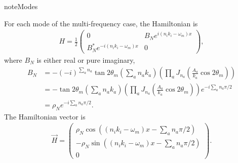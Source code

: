 \documentclass[letterpaper,12pt,english]{sphinxmanual}
\begin{document}
\begin{sphinxadmonition}{note}{Modes}

For each mode of the multi-frequency case, the Hamiltonian is
\begin{equation*}
\begin{split}H = \frac{1}{2}\begin{pmatrix}
0 & B_N e^{i(n_i k_i -\omega_m)x} \\
B_N^* e^{-i(n_i k_i -\omega_m)x} & 0
\end{pmatrix},\end{split}
\end{equation*}
where \(B_N\) is either real or pure imaginary,
\begin{equation*}
\begin{split}B_N &= -(-i)^{\sum_a n_a} \tan 2\theta_m \left( \sum_a n_a k_a \right) \left( \prod_a J_{n_a}\left( \frac{A_a}{k_a}\cos 2\theta_m \right) \right)\\
& = - \tan 2\theta_m \left( \sum_a n_a k_a \right) \left( \prod_a J_{n_a}\left( \frac{A_a}{k_a}\cos 2\theta_m \right) \right) e^{-i \sum_a n_a \pi/2}\\
& = \rho_{N} e^{-i \sum_a n_a \pi/2}.\end{split}
\end{equation*}
The Hamiltonian vector is
\begin{equation*}
\begin{split}\vec H = \begin{pmatrix}
\rho_N \cos\left( (n_i k_i -\omega_m)x - \sum_a n_a \pi/2 \right) \\
-\rho_N \sin\left( (n_i k_i -\omega_m)x - \sum_a n_a \pi/2 \right) \\
0
\end{pmatrix}.\end{split}
\end{equation*}\end{sphinxadmonition}
\end{document}
